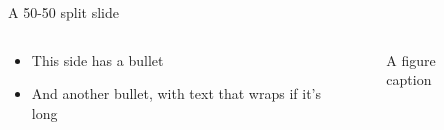 \begin{frame}{A 50-50 split slide}

  \begin{columns}
    \begin{column}{0.5\linewidth}
      \begin{itemize}
        \item This side has a bullet
        \item And another bullet, with text that wraps if it's long
      \end{itemize}
    \end{column}
    \begin{column}{0.5\linewidth}
      \begin{figure}
        \centering
        \caption{A figure caption}
      \end{figure}
    \end{column}
  \end{columns}

\end{frame}

